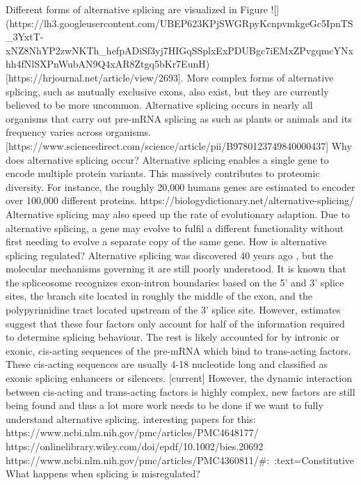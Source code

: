 Different forms of alternative splicing are visualized in Figure ![](https://lh3.googleusercontent.com/UBEP623KPjSWGRpyKcnpvmkgeGc5IpnTS_3YxtT-xNZ8NhYP2zwNKTh_hefpADiSf3yj7HIGqSSplxExPDUBgc7iEMxZPvgqmcYNxhh4fNlSXPnWubAN9Q4xAR8Ztgq5bKr7EunH) [https://hrjournal.net/article/view/2693]. More complex forms of alternative splicing, such as mutually exclusive exons, also exist, but they are currently believed to be more uncommon. Alternative splicing occurs in nearly all organisms that carry out pre-mRNA splicing as such as plants or animals and its frequency varies across organisms. [https://www.sciencedirect.com/science/article/pii/B9780123749840000437]
Why does alternative splicing occur?
Alternative splicing enables a single gene to encode multiple protein variants. This massively contributes to proteomic diversity. For instance, the roughly 20,000 humans genes are estimated to encoder over 100,000 different proteins. https://biologydictionary.net/alternative-splicing/
Alternative splicing may also speed up the rate of evolutionary adaption. Due to alternative splicing, a gene may evolve to fulfil a different functionality without first needing to evolve a separate copy of the same gene. \cite{bretschneiderphdthesis}
How is alternative splicing regulated?
Alternative splicing was discovered 40 years ago \cite{discoveryofsplicing}, but the molecular mechanisms governing it are still poorly understood. It is known that the spliceosome recognizes exon-intron boundaries based on the 5' and 3' splice sites, the branch site located in roughly the middle of the exon, and the polypyrimidine tract located upstream of the 3' splice site. However, estimates suggest that these four factors only account for half of the information required to determine splicing behaviour. The rest is likely accounted for by intronic or exonic, cis-acting sequences of the pre-mRNA which bind to trans-acting factors. These cis-acting sequences are usually 4-18 nucleotide long and classified as exonic splicing enhancers or silencers. [current]
However, the dynamic interaction between cis-acting and trans-acting factors is highly complex, new factors are still being found and thus a lot more work needs to be done if we want to fully understand alternative splicing.
interesting papers for this:
https://www.ncbi.nlm.nih.gov/pmc/articles/PMC4648177/
https://onlinelibrary.wiley.com/doi/epdf/10.1002/bies.20692
https://www.ncbi.nlm.nih.gov/pmc/articles/PMC4360811/#:~:text=Constitutive%
What happens when splicing is misregulated?
